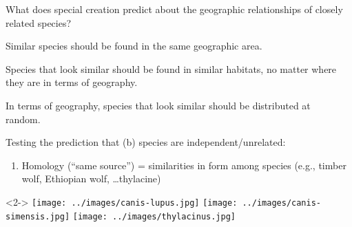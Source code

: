 \begin{frame}
    \begin{clickerquestion}
        \item What does special creation predict about the
            geographic relationships of closely related species? 
        \begin{clickeroptions}
            \item Similar species should be found in the same geographic area.
            \item Species that look similar should be found in similar
                habitats, no matter where they are in terms of geography.
            \item In terms of geography, species that look similar should be
                distributed at random. 
            \item {}
        \end{clickeroptions}
    \end{clickerquestion}

\end{frame}

\begin{frame}

    Testing the prediction that (b) species are independent/unrelated:

    \begin{enumerate}
        \item Homology (``same source'') = similarities in form among species
            (e.g., timber wolf, Ethiopian wolf, \ldots thylacine)
    \end{enumerate}

    \begin{uncoverenv}<2->
    \texttt{[image: ../images/canis-lupus.jpg]}\hspace{0.1mm}
    \texttt{[image: ../images/canis-simensis.jpg]}\hspace{0.1mm}
    \texttt{[image: ../images/thylacinus.jpg]}
    \end{uncoverenv}


\end{frame}

